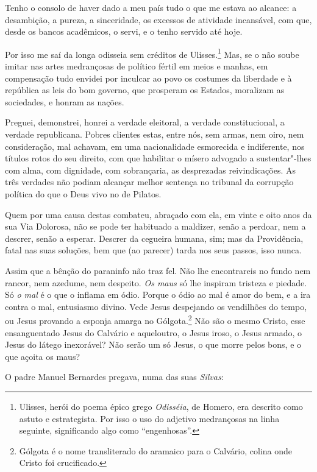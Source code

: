 Tenho o consolo de haver dado a meu país tudo o que me estava ao
alcance: a desambição, a pureza, a sinceridade, os excessos de
atividade incansável, com que, desde os bancos acadêmicos, o servi, e o
tenho servido até hoje.

Por isso me saí da longa odisseia sem créditos de
Ulisses.\footnote{Ulisses, herói do poema épico grego \emph{Odisséia}, de Homero, era 
descrito como astuto e estrategista. Por isso o uso do adjetivo medrançosas na linha seguinte, significando algo como ``engenhosas''.} Mas, se o não soube imitar nas artes
medrançosas de político fértil em meios e manhas, em compensação tudo
envidei por inculcar ao povo os costumes da liberdade e à república as
leis do bom governo, que prosperam os Estados, moralizam as sociedades,
e honram as nações.

Preguei, demonstrei, honrei a verdade eleitoral, a verdade
constitucional, a verdade republicana. Pobres clientes estas, entre
nós, sem armas, nem oiro, nem consideração, mal achavam, em uma
nacionalidade esmorecida e indiferente, nos títulos rotos do seu
direito, com que habilitar o mísero advogado a sustentar"-lhes com alma,
com dignidade, com sobrançaria, as desprezadas reivindicações. As três
verdades não podiam alcançar melhor sentença no tribunal da corrupção
política do que o Deus vivo no de Pilatos.

Quem por uma causa destas combateu, abraçado com ela, em vinte e
oito anos da sua Via Dolorosa, não se pode ter habituado a maldizer, senão a
perdoar, nem a descrer, senão a esperar. Descrer da cegueira humana,
sim; mas da Providência, fatal nas suas soluções, bem que (ao parecer)
tarda nos seus passos, isso nunca.

Assim que a bênção do paraninfo não traz fel. Não lhe
encontrareis no fundo nem rancor, nem azedume, nem despeito. \textit{Os
maus} só lhe inspiram tristeza e piedade. Só \textit{o mal} é o que o
inflama em ódio. Porque o ódio ao mal é amor do bem, e a ira contra o
mal, entusiasmo divino. Vede Jesus despejando os vendilhões do tempo,
ou Jesus provando a esponja amarga no Gólgota.\footnote{Gólgota é o nome transliterado do aramaico para o Calvário, colina onde Cristo foi crucificado.} Não são o
mesmo Cristo, esse ensanguentado Jesus do Calvário e aqueloutro, o
Jesus iroso, o Jesus armado, o Jesus do látego inexorável? Não serão um
só Jesus, o que morre pelos bons, e o que açoita os maus?

O padre Manuel Bernardes pregava, numa das suas \textit{Silvas}:

